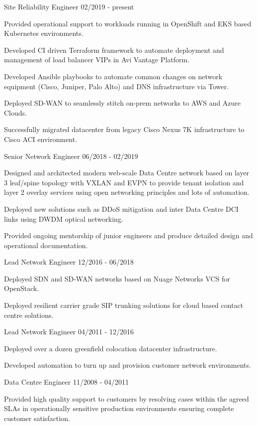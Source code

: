 \documentclass[11pt]{article} %
\begin{document}
\begin{description}
\squish
{}
           {Site Reliability Engineer}
           {02/2019 - present}

Provided operational support to workloads running in OpenShift and EKS based Kubernetes environments.

Developed CI driven Terraform framework to automate deployment and management of load balancer VIPs in Avi Vantage Platform.

Developed Ansible playbooks to automate common changes on network equipment (Cisco, Juniper, Palo Alto) and DNS infrastructure via Tower.

Deployed SD-WAN to seamlessly stitch on-prem networks to AWS and Azure Clouds.

Successfully migrated datacenter from legacy Cisco Nexus 7K infrastructure to Cisco ACI environment.

           {Senior Network Engineer}
           {06/2018 - 02/2019}

Designed and architected modern web-scale Data Centre network based on layer 3 leaf/spine topology with VXLAN and EVPN to provide tenant isolation and layer 2 overlay services using open networking principles and lots of automation.

Deployed new solutions such as DDoS mitigation and inter Data Centre DCI links using DWDM optical networking.

Provided ongoing mentorship of junior engineers and produce detailed design and operational documentation.  
           
           {Lead Network Engineer}
           {12/2016 - 06/2018}

Deployed SDN and SD-WAN networks based on Nuage Networks VCS for OpenStack.

Deployed resilient carrier grade SIP trunking solutions for cloud based contact centre solutions. 

           {Lead Network Engineer}
           {04/2011 - 12/2016}

Deployed over a dozen greenfield colocation datacenter infrastructure.

Developed automation to turn up and provision customer network environments.

           {Data Centre Engineer}
           {11/2008 - 04/2011}

Provided high quality support to customers by resolving cases within the agreed SLAs in operationally sensitive production environments ensuring complete customer satisfaction.


\end{description}
\end{document}
